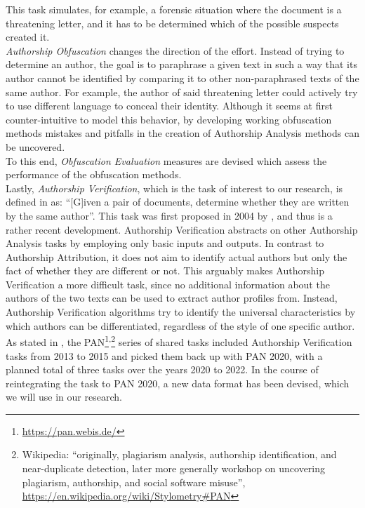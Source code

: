This task simulates, for example, a forensic situation where the document is a threatening letter, and it has to be determined which of the possible suspects created it.\\
\textit{Authorship Obfuscation} changes the direction of the effort.
Instead of trying to determine an author, the goal is to paraphrase a given text in such a way that its author cannot be identified by comparing it to other non-paraphrased texts of the same author.
For example, the author of said threatening letter could actively try to use different language to conceal their identity.
Although it seems at first counter-intuitive to model this behavior, by developing working obfuscation methods mistakes and pitfalls in the creation of Authorship Analysis methods can be uncovered.\\
To this end, \textit{Obfuscation Evaluation} measures are devised which assess the performance of the obfuscation methods.\\
Lastly, \textit{Authorship Verification}, which is the task of interest to our research, is defined in \cite{stein2019unbiasedGutenbergCorpus} as: ``[G]iven a pair of documents, determine whether they are written by the same author''.
This task was first proposed in 2004 by \cite{koppel2004unmasking}, and thus is a rather recent development.
Authorship Verification abstracts on other Authorship Analysis tasks by employing only basic inputs and outputs.
In contrast to Authorship Attribution, it does not aim to identify actual authors but only the fact of whether they are different or not.
This arguably makes Authorship Verification a more difficult task, since no additional information about the authors of the two texts can be used to extract author profiles from.
Instead, Authorship Verification algorithms try to identify the universal characteristics by which authors can be differentiated, regardless of the style of one specific author.
As stated in \cite{bevendorff2020shared}, the PAN\footnote{\url{https://pan.webis.de/}}\textsuperscript{,}\footnote{Wikipedia: ``originally, plagiarism analysis, authorship identification, and near-duplicate detection, later more generally workshop on uncovering plagiarism, authorship, and social software misuse'', \url{https://en.wikipedia.org/wiki/Stylometry\#PAN}} series of shared tasks included Authorship Verification tasks from 2013 to 2015 and picked them back up with PAN 2020, with a planned total of three tasks over the years 2020 to 2022.
In the course of reintegrating the task to PAN 2020, a new data format has been devised, which we will use in our research.\\
